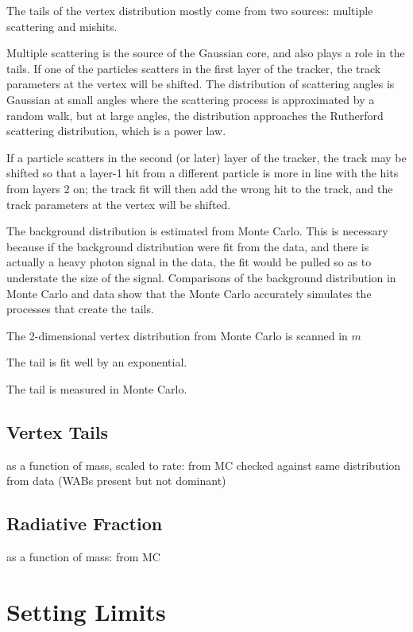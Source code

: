 The tails of the vertex distribution mostly come from two sources: multiple scattering and mishits.

Multiple scattering is the source of the Gaussian core, and also plays a role in the tails.
If one of the particles scatters in the first layer of the tracker, the track parameters at the vertex will be shifted.
The distribution of scattering angles is Gaussian at small angles where the scattering process is approximated by a random walk, but at large angles, the distribution approaches the Rutherford scattering distribution, which is a power law.

If a particle scatters in the second (or later) layer of the tracker, the track may be shifted so that a layer-1 hit from a different particle is more in line with the hits from layers 2 on; the track fit will then add the wrong hit to the track, and the track parameters at the vertex will be shifted.

The background distribution is estimated from Monte Carlo.
This is necessary because if the background distribution were fit from the data, and there is actually a heavy photon signal in the data, the fit would be pulled so as to understate the size of the signal.
Comparisons of the background distribution in Monte Carlo and data show that the Monte Carlo accurately simulates the processes that create the tails.

The 2-dimensional vertex distribution from Monte Carlo is scanned in $m$

The tail is fit well by an exponential.

The tail is measured in Monte Carlo.




\subsection{Vertex Tails}
as a function of mass, scaled to rate: from MC
checked against same distribution from data
(WABs present but not dominant)
\subsection{Radiative Fraction}
as a function of mass: from MC
\section{Setting Limits}

\cite{yellin_finding_2002}
